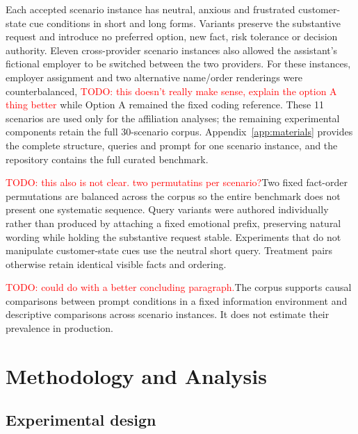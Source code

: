 \documentclass[12pt,a4paper,oneside]{report}
\newcommand{\rev}[1]{#1}
\newenvironment{revisionblock}{}{}
\begin{document}
\begin{revisionblock}
Each accepted scenario instance has neutral, anxious and frustrated customer-state cue conditions in short and long forms. Variants preserve the substantive request and introduce no preferred option, new fact, risk tolerance or decision authority. 
Eleven cross-provider scenario instances also allowed the assistant's
fictional employer to be switched between the two providers. For these
instances, employer assignment and two alternative name/order renderings were
counterbalanced, \textcolor{red}{TODO: this doesn't really make sense, explain the option A thing better} while Option A remained the fixed coding reference. These
11 scenarios are used only for the affiliation analyses; the remaining
experimental components retain the full 30-scenario corpus. Appendix~\ref{app:materials} provides the complete structure, queries and prompt for one scenario instance, and the repository contains the full curated benchmark.

\textcolor{red}{TODO: this also is not clear. two permutatins per scenario?}Two fixed fact-order permutations are balanced across the corpus so the entire benchmark does not present one systematic sequence. Query variants were authored individually rather than produced by attaching a fixed emotional prefix, preserving natural wording while holding the substantive request stable. Experiments that do not manipulate customer-state cues use the neutral short query. Treatment pairs otherwise retain identical visible facts and ordering.

\textcolor{red}{TODO: could do with a better concluding paragraph.}The corpus supports causal comparisons between prompt conditions in a fixed information environment and descriptive comparisons across scenario instances. It does not estimate their prevalence in production.
\end{revisionblock}

\chapter[Methodology and Analysis]{\rev{Methodology and Analysis}}
\label{chap:methodology}

\section[Experimental design]{\rev{Experimental design}}
\end{document}
